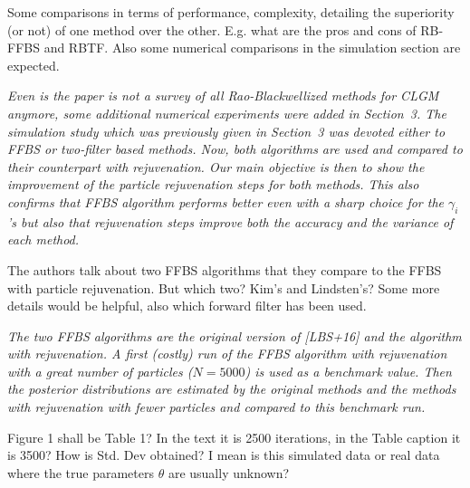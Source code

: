 \vspace{.5cm}

\noindent Some comparisons in terms of performance, complexity, detailing the superiority (or not) of one method over the other. E.g. what are the pros and cons of RB-FFBS and RBTF. Also some numerical comparisons in the simulation section are expected.

\vspace{.2cm}

{\em
\noindent Even is the paper is not a survey of all Rao-Blackwellized methods for CLGM anymore, some additional numerical experiments were added in Section~3. The simulation study which was previously given in Section~3 was devoted either to FFBS or two-filter based methods. Now, both algorithms are used and compared to their counterpart with rejuvenation. Our main objective is then to show the improvement of the particle rejuvenation steps for both methods.  This also confirms that FFBS algorithm performs better even with a sharp choice for the  $\gamma_i$'s but also that rejuvenation steps improve both the accuracy and the variance of each method.
}

\vspace{.5cm}

 
\vspace{.5cm}
 
\noindent The authors talk about two FFBS algorithms that they compare to the FFBS with
particle rejuvenation. But which two? Kim's and Lindsten's? Some more details
would be helpful, also which forward filter has been used.

\vspace{.2cm}

{\em 
\noindent The two FFBS algorithms are the original version of [LBS+16]  and the algorithm with rejuvenation.
A first (costly) run of the FFBS algorithm with rejuvenation with a great number of particles ($N=5000$) is used as a benchmark value. Then the posterior distributions are estimated by the original methods and the methods with rejuvenation with fewer particles and compared to this  benchmark run.
}

\vspace{.5cm}

\noindent Figure 1 shall be Table 1? In the text it is 2500 iterations, in the Table
caption it is 3500? How is Std. Dev obtained? I mean is this simulated data or real data where
the true parameters $\theta$ are usually unknown?

